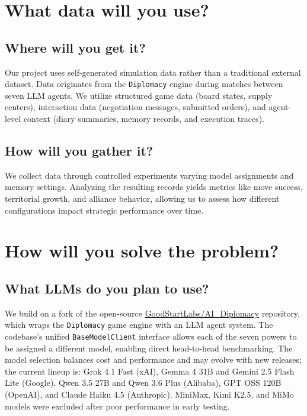 \documentclass[a4paper,oneside,bibliography=totoc]{scrbook}
\begin{document}
\section{What data will you use?}

\subsection{Where will you get it?}
Our project uses self-generated simulation data rather than a traditional external dataset. Data originates from the \texttt{Diplomacy} engine during matches between seven LLM agents. We utilize structured game data (board states, supply centers), interaction data (negotiation messages, submitted orders), and agent-level context (diary summaries, memory records, and execution traces).

\subsection{How will you gather it?}
We collect data through controlled experiments varying model assignments and memory settings. Analyzing the resulting records yields metrics like move success, territorial growth, and alliance behavior, allowing us to assess how different configurations impact strategic performance over time.

\section{How will you solve the problem?}

\subsection{What LLMs do you plan to use?}

We build on a fork of the open-source \href{https://github.com/GoodStartLabs/AI_Diplomacy}{GoodStartLabs/AI\_Diplomacy} repository, which wraps the \texttt{Diplomacy} game engine with an LLM agent system. The codebase's unified \texttt{BaseModelClient} interface allows each of the seven powers to be assigned a different model, enabling direct head-to-head benchmarking. The model selection balances cost and performance and may evolve with new releases; the current lineup is: Grok 4.1 Fast (xAI), Gemma 4 31B and Gemini 2.5 Flash Lite (Google), Qwen 3.5 27B and Qwen 3.6 Plus (Alibaba), GPT OSS 120B (OpenAI), and Claude Haiku 4.5 (Anthropic). MiniMax, Kimi K2.5, and MiMo models were excluded after poor performance in early testing.
\end{document}
